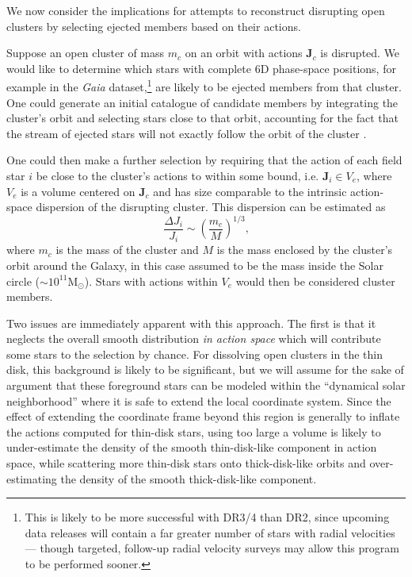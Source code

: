 \documentclass[twocolumn]{aastex62}
\newcommand{\Msun}{\ensuremath{\text{M}_\odot}}
\newcommand{\beq}{\begin{equation}}
\newcommand{\eeq}{\end{equation}}
\begin{document}
We now consider the implications for attempts to reconstruct disrupting open
clusters by selecting ejected members based on their actions.

Suppose an open cluster of mass $m_c$ on an orbit with actions $\bm{J}_c$ is
disrupted. We would like to determine which stars with complete 6D phase-space
positions, for example in the {\em Gaia} dataset,\footnote{This is likely to
be more successful with DR3/4 than DR2, since upcoming data releases will
contain a far greater number of stars with radial velocities --- though
targeted, follow-up radial velocity surveys may allow this program to be
performed sooner.} are likely to be ejected members from that cluster. One
could generate an initial catalogue of candidate members by integrating the
cluster's orbit and selecting stars close to that orbit, accounting for the
fact that the stream of ejected stars will not exactly follow the orbit of the
cluster \citep[e.g.][]{2011MNRAS.413.1852E}.

One could then make a further selection by requiring that the action of each
field star $i$ be close to the cluster's actions to within some bound, i.e.
$\bm{J}_i \in V_e$, where $V_e$ is a volume centered on $\bm{J}_c$ and has size
comparable to the intrinsic action-space dispersion of the disrupting
cluster. This dispersion can be estimated as \citep[Section~8.3.3
of][]{2008gady.book.....B}
\beq \label{eq:action_disp}
\frac{\Delta J_i}{J_i} \sim \left(\frac{m_c}{M}\right)^{1/3}\text{,}
\eeq
where $m_c$ is the mass of the cluster and $M$ is the mass enclosed by the
cluster's orbit around the Galaxy, in this case assumed to be the mass inside
the Solar circle ($\sim 10^{11}\Msun$). Stars with actions within $V_e$ would
then be considered cluster members.

Two issues are immediately apparent with this approach. The first is that it
neglects the overall smooth distribution \emph{in action space} which will
contribute some stars to the selection by chance. For dissolving open clusters
in the thin disk, this background is likely to be significant, but we will
assume for the sake of argument that these foreground stars can be modeled
within the ``dynamical solar neighborhood'' where it is safe to extend the
local coordinate system. Since the effect of extending the coordinate frame
beyond this region is generally to inflate the actions computed for thin-disk
stars, using too large a volume is likely to under-estimate the density of the
smooth thin-disk-like component in action space, while scattering more
thin-disk stars onto thick-disk-like orbits and over-estimating the density of
the smooth thick-disk-like component.
\end{document}
